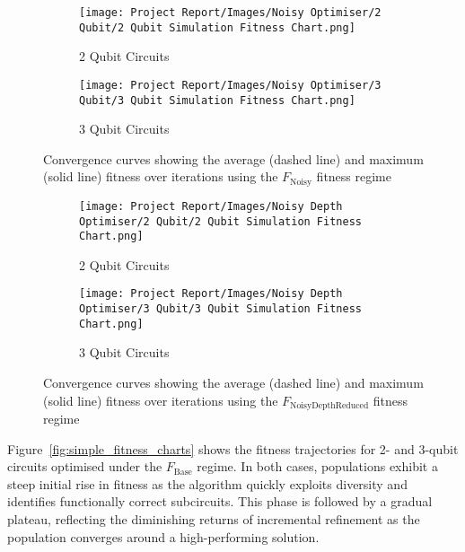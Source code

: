 \documentclass[11pt,a4paper]{article}
\begin{document}
\begin{figure}[H]
\centering
\begin{subfigure}{.5\textwidth}
  \centering
  \texttt{[image: Project Report/Images/Noisy Optimiser/2 Qubit/2 Qubit Simulation Fitness Chart.png]}
  \caption{2 Qubit Circuits}
  \label{fig:noisy_fitness_2q}
\end{subfigure}%
\begin{subfigure}{.5\textwidth}
  \centering
  \texttt{[image: Project Report/Images/Noisy Optimiser/3 Qubit/3 Qubit Simulation Fitness Chart.png]}
  \caption{3 Qubit Circuits}
  \label{fig:noisy_fitness_3q}
\end{subfigure}
\caption{Convergence curves showing the average (dashed line) and maximum (solid line) fitness over iterations using the $F_{\mathrm{Noisy}}$ fitness regime}
\label{fig:noisy_fitness_charts}
\end{figure}

\begin{figure}[H]
\centering
\begin{subfigure}{.5\textwidth}
  \centering
  \texttt{[image: Project Report/Images/Noisy Depth Optimiser/2 Qubit/2 Qubit Simulation Fitness Chart.png]}
  \caption{2 Qubit Circuits}
  \label{fig:noisy_depth_fitness_2q}
\end{subfigure}%
\begin{subfigure}{.5\textwidth}
  \centering
  \texttt{[image: Project Report/Images/Noisy Depth Optimiser/3 Qubit/3 Qubit Simulation Fitness Chart.png]}
  \caption{3 Qubit Circuits}
  \label{fig:noisy_depth_fitness_3q}
\end{subfigure}
\caption{Convergence curves showing the average (dashed line) and maximum (solid line) fitness over iterations using the $F_{\mathrm{NoisyDepthReduced}}$ fitness regime}
\label{fig:noisy_depth_fitness_charts}
\end{figure}

Figure~\ref{fig:simple_fitness_charts} shows the fitness trajectories for 2- and 3-qubit circuits optimised under the $F_{\mathrm{Base}}$ regime. In both cases, populations exhibit a steep initial rise in fitness as the algorithm quickly exploits diversity and identifies functionally correct subcircuits. This phase is followed by a gradual plateau, reflecting the diminishing returns of incremental refinement as the population converges around a high-performing solution.\newline
\end{document}
